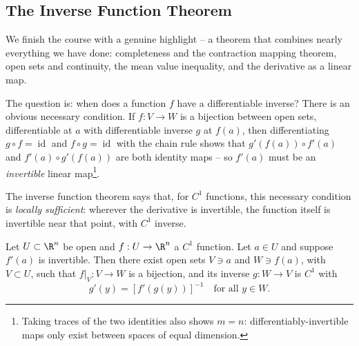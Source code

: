 \subsection{The Inverse Function Theorem}

We finish the course with a genuine highlight -- a theorem that combines nearly everything we have done: completeness and the contraction mapping theorem, open sets and continuity, the mean value inequality, and the derivative as a linear map.

The question is: when does a function $f$ have a differentiable inverse? There is an obvious necessary condition. If $f: V \rightarrow W$ is a bijection between open sets, differentiable at $a$ with differentiable inverse $g$ at $f(a)$, then differentiating $g \circ f = \operatorname{id}$ and $f \circ g = \operatorname{id}$ with the chain rule shows that $g'(f(a)) \circ f'(a)$ and $f'(a) \circ g'(f(a))$ are both identity maps -- so $f'(a)$ must be an \emph{invertible} linear map\footnote{Taking traces of the two identities also shows $m = n$: differentiably-invertible maps only exist between spaces of equal dimension.}.

The inverse function theorem says that, for $C^1$ functions, this necessary condition is \emph{locally sufficient}: wherever the derivative is invertible, the function itself is invertible near that point, with $C^1$ inverse.

\begin{theorem}
    Let $U \subset \R^n$ be open and $f: U \rightarrow \R^n$ a $C^1$ function. Let $a \in U$ and suppose $f'(a)$ is invertible. Then there exist open sets $V \ni a$ and $W \ni f(a)$, with $V \subset U$, such that $f|_V: V \rightarrow W$ is a bijection, and its inverse $g: W \rightarrow V$ is $C^1$ with
    $$
    g'(y) = \left[f'(g(y))\right]^{-1} \quad \text{for all } y \in W.
    $$
\end{theorem}

\begin{center}
\end{center}

